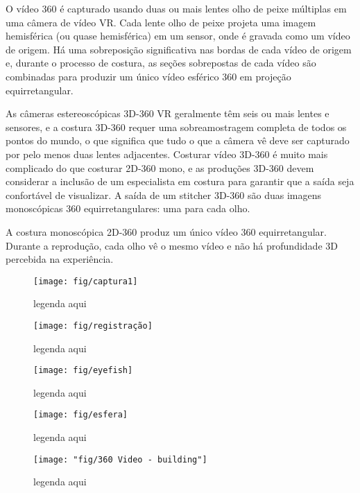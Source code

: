 O vídeo 360 é capturado usando duas ou mais lentes olho de peixe múltiplas em uma câmera de vídeo VR. Cada lente olho de peixe projeta uma imagem hemisférica (ou quase hemisférica) em um sensor, onde é gravada como um vídeo de origem. Há uma sobreposição significativa nas bordas de cada vídeo de origem e, durante o processo de costura, as seções sobrepostas de cada vídeo são combinadas para produzir um único vídeo esférico 360 em projeção equirretangular.


As câmeras estereoscópicas 3D-360 VR geralmente têm seis ou mais lentes e sensores, e a costura 3D-360 requer uma sobreamostragem completa de todos os pontos do mundo, o que significa que tudo o que a câmera vê deve ser capturado por pelo menos duas lentes adjacentes. Costurar vídeo 3D-360 é muito mais complicado do que costurar 2D-360 mono, e as produções 3D-360 devem considerar a inclusão de um especialista em costura para garantir que a saída seja confortável de visualizar. A saída de um stitcher 3D-360 são duas imagens monoscópicas 360 equirretangulares: uma para cada olho.


A costura monoscópica 2D-360 produz um único vídeo 360 equirretangular. Durante a reprodução, cada olho vê o mesmo vídeo e não há profundidade 3D percebida na experiência.



\begin{figure}[tbh]
	\centering
	\texttt{[image: fig/captura1]}
	\caption{legenda aqui}
	\label{fig:captura1}
\end{figure}

\begin{figure}[tbh]
	\centering
	\texttt{[image: fig/registração]}
	\caption{legenda aqui}
	\label{fig:registracao}
\end{figure}

\begin{figure}[tbh]
	\centering
	\texttt{[image: fig/eyefish]}
	\caption{legenda aqui}
	\label{fig:eyefish}
\end{figure}

\begin{figure}[tbh]
	\centering
	\texttt{[image: fig/esfera]}
	\caption{legenda aqui}
	\label{fig:esfera}
\end{figure}


\begin{figure}[tbh]
	\centering
	\texttt{[image: "fig/360 Video - building"]}
	\caption{legenda aqui}
	\label{fig:building_360_video}
\end{figure}






